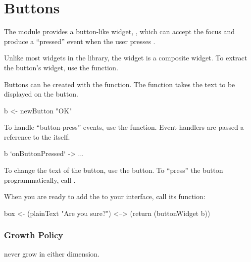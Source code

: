 \section{Buttons}

The  module provides a button-like widget, ,
which can accept the focus and produce a ``pressed'' event when the
user presses .

Unlike most widgets in the library, the  widget is a
composite widget.  To extract the button's widget, use the
 function.

Buttons can be created with the  function.  The function
takes the text to be displayed on the button.

\begin{haskellcode}
 b <- newButton "OK"
\end{haskellcode}

To handle ``button-press'' events, use the 
function.  Event handlers are passed a reference to the 
itself.

\begin{haskellcode}
 b `onButtonPressed` \this ->
   ...
\end{haskellcode}

To change the text of the button, use the  button.
To ``press'' the button programmatically, call .

When you are ready to add the  to your interface, call its
 function:

\begin{haskellcode}
 box <- (plainText "Are you sure?") <--> (return (buttonWidget b))
\end{haskellcode}

\subsubsection{Growth Policy}

 never grow in either dimension.
